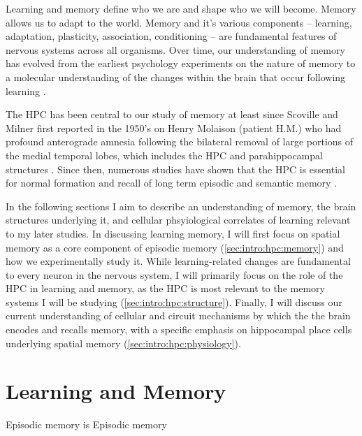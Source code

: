 \acresetall
Learning and memory define who we are and shape who we will become.
Memory allows us to adapt to the world.
Memory and it's various components -- learning, adaptation, plasticity, association, conditioning -- are fundamental features of nervous systems across all organisms.
Over time, our understanding of memory has evolved from the earliest psychology experiments on the nature of memory \citep{Ebbinghaus1885} to a molecular understanding of the changes within the brain that occur following learning \citep{Kandel2001}.

The \ac{HPC} has been central to our study of memory at least since Scoville and Milner first reported in the 1950's on Henry Molaison (patient H.M.) who had profound anterograde amnesia following the bilateral removal of large portions of the medial temporal lobes, which includes the \ac{HPC} and parahippocampal structures \citep{Scoville1957}.
Since then, numerous studies have shown that the \ac{HPC} is essential for normal formation and recall of long term episodic and semantic memory \citep[reviewd in][]{Eichenbaum2000, Burgess2002}.

In the following sections I aim to describe an understanding of memory, the brain structures underlying it, and cellular phsyiological correlates of learning relevant to my later studies.
In discussing learning memory, I will first focus on spatial memory as a core component of episodic memory (\ref{sec:intro:hpc:memory}) and how we experimentally study it.
While learning-related changes are fundamental to every neuron in the nervous system, I will primarily focus on the role of the \ac{HPC} in learning and memory, as the \ac{HPC} is most relevant to the memory systems I will be studying (\ref{sec:intro:hpc:structure}).
Finally, I will discuss our current understanding of cellular and circuit mechanisms by which the the brain encodes and recalls memory, with a specific emphasis on hippocampal place cells underlying spatial memory (\ref{sec:intro:hpc:physiology}).

\section{Learning and Memory}






Episodic memory is 
Episodic memory \citep{Tulving1972}

